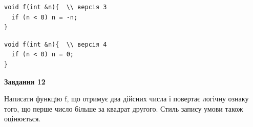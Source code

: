 \documentclass[12pt, ukrainian]{article}
\begin{document}
{\begin {large}
\begin{minipage}[t]{11.0cm}
\vspace{-8mm}\begin{verbatim}
void f(int &n){  \\ версія 3
  if (n < 0) n = -n;
}
\end{verbatim}

\vspace{-8mm}\begin{verbatim}
void f(int &n){  \\ версія 4
  if (n < 0) n = 0;
}
\end{verbatim}



\begin{center}
\textbf{Завдання 12}
\end{center}

Написати функцiю f, що отримує два дійсних числа і повертає логічну ознаку того, що перше число бiльше за квадрат другого. Стиль запису умови також оцінюється.\par

\end{minipage}

\end {large}}
\newpage
\end{document}
